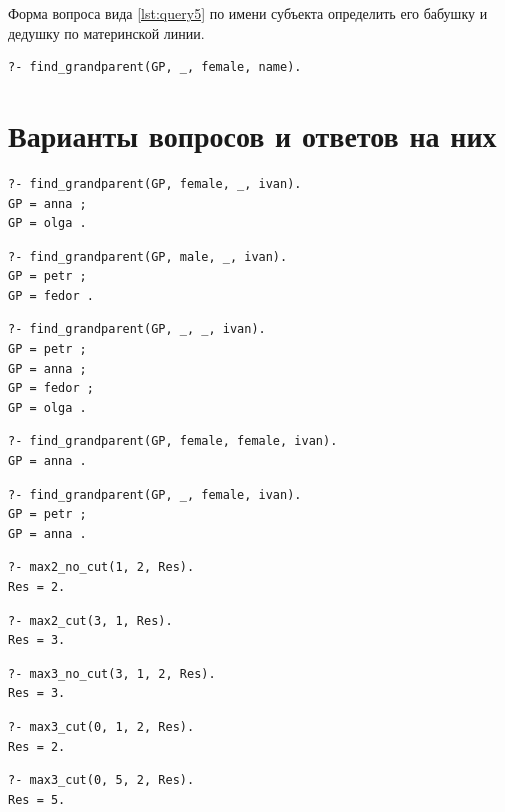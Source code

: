 Форма вопроса вида \ref{lst:query5} по имени субъекта определить его бабушку и дедушку по материнской линии.
\begin{lstlisting}[caption={Форма задания вопроса 5}, label={lst:query5}]
?- find_grandparent(GP, _, female, name).
\end{lstlisting}

\section{Варианты вопросов и ответов на них}

\begin{lstlisting}[caption={Вопрос и ответ №1}, label={lst:q1}]
?- find_grandparent(GP, female, _, ivan).
GP = anna ;
GP = olga .
\end{lstlisting}

\begin{lstlisting}[caption={Вопрос и ответ №2}, label={lst:q2}]
?- find_grandparent(GP, male, _, ivan).
GP = petr ;
GP = fedor .
\end{lstlisting}

\begin{lstlisting}[caption={Вопрос и ответ №3}, label={lst:q3}]
?- find_grandparent(GP, _, _, ivan).
GP = petr ;
GP = anna ;
GP = fedor ;
GP = olga .
\end{lstlisting}

\begin{lstlisting}[caption={Вопрос и ответ №4}, label={lst:q4}]
?- find_grandparent(GP, female, female, ivan).
GP = anna .
\end{lstlisting}

\begin{lstlisting}[caption={Вопрос и ответ №5}, label={lst:q5}]
?- find_grandparent(GP, _, female, ivan).
GP = petr ;
GP = anna .
\end{lstlisting}

\begin{lstlisting}[caption={Вопрос и ответ №6}, label={lst:q6}]
?- max2_no_cut(1, 2, Res).
Res = 2.
\end{lstlisting}

\begin{lstlisting}[caption={Вопрос и ответ №7}, label={lst:q7}]
?- max2_cut(3, 1, Res).
Res = 3.
\end{lstlisting}

\begin{lstlisting}[caption={Вопрос и ответ №8}, label={lst:q8}]
?- max3_no_cut(3, 1, 2, Res).
Res = 3.
\end{lstlisting}

\begin{lstlisting}[caption={Вопрос и ответ №9}, label={lst:q9}]
?- max3_cut(0, 1, 2, Res).
Res = 2.
\end{lstlisting}

\begin{lstlisting}[caption={Вопрос и ответ №10}, label={lst:q10}]
?- max3_cut(0, 5, 2, Res).
Res = 5.
\end{lstlisting}
